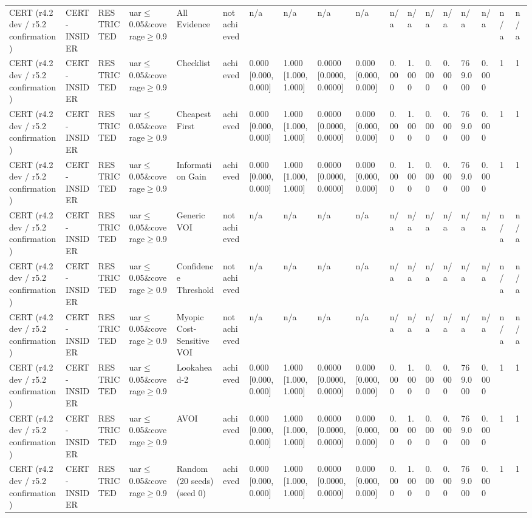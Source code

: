 \begin{table}[!ht]
{\begin{tabular}{llllllllllllllllll}
CERT (r4.2 dev / r5.2 confirmation) & CERT-INSIDER & RESTRICTED & uar$\le$0.05\&coverage$\ge$0.9 & All Evidence & not achieved & n/a & n/a & n/a & n/a & n/a & n/a & n/a & n/a & n/a & n/a & n/a & n/a \\
CERT (r4.2 dev / r5.2 confirmation) & CERT-INSIDER & RESTRICTED & uar$\le$0.05\&coverage$\ge$0.9 & Checklist & achieved & 0.000 [0.000, 0.000] & 1.000 [1.000, 1.000] & 0.0000 [0.0000, 0.0000] & 0.000 [0.000, 0.000] & 0.000 & 1.000 & 0.000 & 0.000 & 769.000 & 0.000 & 1 & 1 \\
CERT (r4.2 dev / r5.2 confirmation) & CERT-INSIDER & RESTRICTED & uar$\le$0.05\&coverage$\ge$0.9 & Cheapest First & achieved & 0.000 [0.000, 0.000] & 1.000 [1.000, 1.000] & 0.0000 [0.0000, 0.0000] & 0.000 [0.000, 0.000] & 0.000 & 1.000 & 0.000 & 0.000 & 769.000 & 0.000 & 1 & 1 \\
CERT (r4.2 dev / r5.2 confirmation) & CERT-INSIDER & RESTRICTED & uar$\le$0.05\&coverage$\ge$0.9 & Information Gain & achieved & 0.000 [0.000, 0.000] & 1.000 [1.000, 1.000] & 0.0000 [0.0000, 0.0000] & 0.000 [0.000, 0.000] & 0.000 & 1.000 & 0.000 & 0.000 & 769.000 & 0.000 & 1 & 1 \\
CERT (r4.2 dev / r5.2 confirmation) & CERT-INSIDER & RESTRICTED & uar$\le$0.05\&coverage$\ge$0.9 & Generic VOI & not achieved & n/a & n/a & n/a & n/a & n/a & n/a & n/a & n/a & n/a & n/a & n/a & n/a \\
CERT (r4.2 dev / r5.2 confirmation) & CERT-INSIDER & RESTRICTED & uar$\le$0.05\&coverage$\ge$0.9 & Confidence Threshold & not achieved & n/a & n/a & n/a & n/a & n/a & n/a & n/a & n/a & n/a & n/a & n/a & n/a \\
CERT (r4.2 dev / r5.2 confirmation) & CERT-INSIDER & RESTRICTED & uar$\le$0.05\&coverage$\ge$0.9 & Myopic Cost-Sensitive VOI & not achieved & n/a & n/a & n/a & n/a & n/a & n/a & n/a & n/a & n/a & n/a & n/a & n/a \\
CERT (r4.2 dev / r5.2 confirmation) & CERT-INSIDER & RESTRICTED & uar$\le$0.05\&coverage$\ge$0.9 & Lookahead-2 & achieved & 0.000 [0.000, 0.000] & 1.000 [1.000, 1.000] & 0.0000 [0.0000, 0.0000] & 0.000 [0.000, 0.000] & 0.000 & 1.000 & 0.000 & 0.000 & 769.000 & 0.000 & 1 & 1 \\
CERT (r4.2 dev / r5.2 confirmation) & CERT-INSIDER & RESTRICTED & uar$\le$0.05\&coverage$\ge$0.9 & AVOI & achieved & 0.000 [0.000, 0.000] & 1.000 [1.000, 1.000] & 0.0000 [0.0000, 0.0000] & 0.000 [0.000, 0.000] & 0.000 & 1.000 & 0.000 & 0.000 & 769.000 & 0.000 & 1 & 1 \\
CERT (r4.2 dev / r5.2 confirmation) & CERT-INSIDER & RESTRICTED & uar$\le$0.05\&coverage$\ge$0.9 & Random (20 seeds) (seed 0) & achieved & 0.000 [0.000, 0.000] & 1.000 [1.000, 1.000] & 0.0000 [0.0000, 0.0000] & 0.000 [0.000, 0.000] & 0.000 & 1.000 & 0.000 & 0.000 & 769.000 & 0.000 & 1 & 1 \\
\bottomrule
\end{tabular}}
\end{table}
